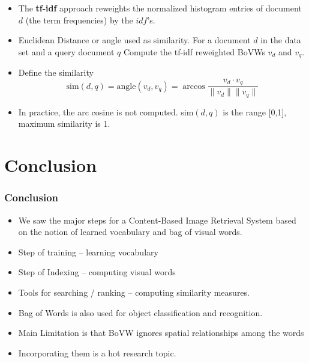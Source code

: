 \documentclass[10pt]{beamer}
\begin{document}
\begin{frame}
  \begin{itemize}
  \item The \textbf{tf-idf} approach reweights the normalized histogram
    entries of document $d$ (the term frequencies) by the $idf$'s.
  \item Euclidean Distance or angle used as similarity. For a document $d$ in the data set and a query document $q$
    Compute the tf-idf reweighted BoVWs $v_d$ and $v_q$. 
  \item Define the similarity
    $$
    \text{sim}(d,q) = \text{angle}(v_d,v_q) = \arccos\frac{v_d\cdot v_q}{\|v_d\|\|v_q\|}
    $$
  \item In practice, the arc cosine is not computed. sim$(d,q)$ is the range [0,1], maximum similarity is 1.
  \end{itemize}
\end{frame}




\section{Conclusion}

\begin{frame}
  \frametitle{Conclusion}
  \begin{itemize}
  \item We saw the major steps for a Content-Based Image Retrieval
    System based on the notion of learned vocabulary and bag of visual
    words.
  \item Step of training -- learning vocabulary
  \item Step of Indexing -- computing visual words
  \item Tools for searching / ranking -- computing similarity measures.
  \item Bag of Words is also used for object classification and recognition.
  \item Main Limitation is that BoVW ignores spatial relationships among the words
  \item Incorporating them is a hot research topic.
  \end{itemize}
\end{frame}
\end{document}

